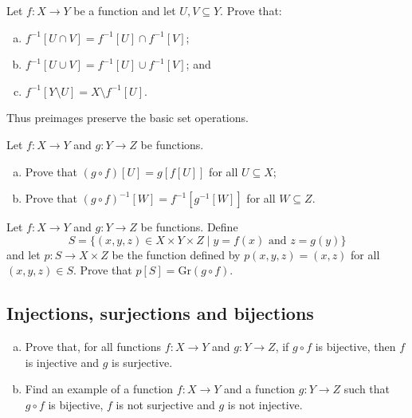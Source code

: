 \begin{chapex}
Let $f : X \to Y$ be a function and let $U, V \subseteq Y$. Prove that:
\begin{enumerate}[(a)]
\item $f^{-1}[U \cap V] = f^{-1}[U] \cap f^{-1}[V]$;
\item $f^{-1}[U \cup V] = f^{-1}[U] \cup f^{-1}[V]$; and
\item $f^{-1}[Y \setminus U] = X \setminus f^{-1}[U]$.
\end{enumerate}
Thus preimages preserve the basic set operations.
\end{chapex}

\begin{chapex}
Let $f : X \to Y$ and $g : Y \to Z$ be functions.
\begin{enumerate}[(a)]
\item Prove that $(g \circ f)[U] = g[f[U]]$ for all $U \subseteq X$;
\item Prove that $(g \circ f)^{-1}[W] = f^{-1}[g^{-1}[W]]$ for all $W \subseteq Z$.
\end{enumerate}
\end{chapex}

\begin{chapex}
\label{cqGraphOfComposite}
Let $f : X \to Y$ and $g : Y \to Z$ be functions. Define
\[ S = \{ (x,y,z) \in X \times Y \times Z \mid y=f(x) \text{ and } z=g(y) \} \]
and let $p : S \to X \times Z$ be the function defined by $p(x,y,z) = (x,z)$ for all $(x,y,z) \in S$. Prove that $p[S]=\mathrm{Gr}(g \circ f)$.
\end{chapex}

\subsection*{Injections, surjections and bijections}

\begin{chapex}
\label{cqCompositeOfFunctionsIsBijection}
\begin{enumerate}[(a)]
\item Prove that, for all functions $f : X \to Y$ and $g : Y \to Z$, if $g \circ f$ is bijective, then $f$ is injective and $g$ is surjective.
\item Find an example of a function $f : X \to Y$ and a function $g : Y \to Z$ such that $g \circ f$ is bijective, $f$ is not surjective and $g$ is not injective.
\end{enumerate}
\end{chapex}

